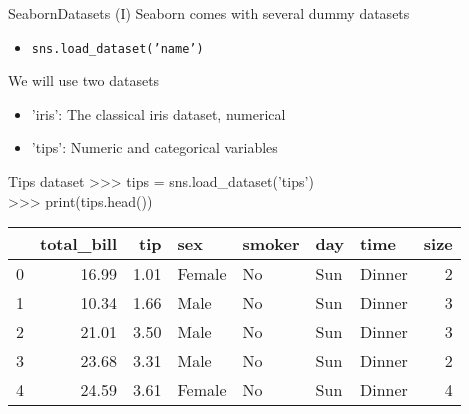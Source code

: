 \documentclass[10pt,compress]{beamer} %
\begin{document}
\begin{frame}[fragile]{Seaborn}{Datasets (I)}
	Seaborn comes with several dummy datasets
	\begin{itemize}
		\item \texttt{sns.load\_dataset('name')}
	\end{itemize}
	We will use two datasets
	\begin{itemize}
		\item 'iris': The classical iris dataset, numerical
		\item 'tips': Numeric and categorical variables
	\end{itemize}

	\footnotesize{
	\begin{exampleblock}{\footnotesize{Tips dataset}}
	>>> tips = sns.load\_dataset('tips')\\
	>>> print(tips.head())\\
	\begin{tabular}{lrrllllr}
		\hline
		{} &  total\_bill &   tip &     sex & smoker &  day &    time &  size \\
		\hline
		0 &       16.99 &  1.01 &  Female &     No &  Sun &  Dinner &     2 \\
		1 &       10.34 &  1.66 &    Male &     No &  Sun &  Dinner &     3 \\
		2 &       21.01 &  3.50 &    Male &     No &  Sun &  Dinner &     3 \\
		3 &       23.68 &  3.31 &    Male &     No &  Sun &  Dinner &     2 \\
		4 &       24.59 &  3.61 &  Female &     No &  Sun &  Dinner &     4 \\
		\hline
	\end{tabular}
	\end{exampleblock}
	}
\end{frame}
\end{document}
